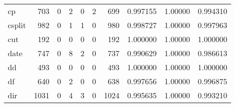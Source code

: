 \begin{longtable}{lrrrrrrrrr}
cp        &                    703 &                                  0 &                                 2 &                                0 &                                 2 &                             699 &                                0.997155 &                                1.00000 &                             0.994310 \\
csplit    &                    982 &                                  0 &                                 1 &                                1 &                                 0 &                             980 &                                0.998727 &                                1.00000 &                             0.997963 \\
cut       &                    192 &                                  0 &                                 0 &                                0 &                                 0 &                             192 &                                1.000000 &                                1.00000 &                             1.000000 \\
date      &                    747 &                                  0 &                                 8 &                                2 &                                 0 &                             737 &                                0.990629 &                                1.00000 &                             0.986613 \\
dd        &                    493 &                                  0 &                                 0 &                                0 &                                 0 &                             493 &                                1.000000 &                                1.00000 &                             1.000000 \\
df        &                    640 &                                  0 &                                 2 &                                0 &                                 0 &                             638 &                                0.997656 &                                1.00000 &                             0.996875 \\
dir       &                   1031 &                                  0 &                                 4 &                                3 &                                 0 &                            1024 &                                0.995635 &                                1.00000 &                             0.993210 \\

\end{longtable}
